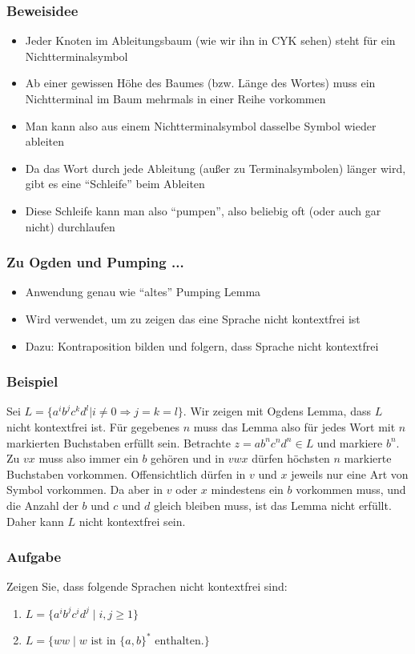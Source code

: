 \documentclass{beamer}
\begin{document}
{\begin{frame}
\frametitle{Beweisidee}
\begin{itemize}
\item Jeder Knoten im Ableitungsbaum (wie wir ihn in CYK sehen) steht für ein Nichtterminalsymbol
\item Ab einer gewissen Höhe des Baumes (bzw. Länge des Wortes) muss ein Nichtterminal im Baum mehrmals in einer Reihe vorkommen
\item Man kann also aus einem Nichtterminalsymbol dasselbe Symbol wieder ableiten
\item Da das Wort durch jede Ableitung (außer zu Terminalsymbolen) länger wird, gibt es eine ``Schleife'' beim Ableiten
\item Diese Schleife kann man also ``pumpen'', also beliebig oft (oder auch gar nicht) durchlaufen
\end{itemize}
\end{frame}

\begin{frame}
\frametitle{Zu Ogden und Pumping ...}
\begin{itemize}
\item Anwendung genau wie ``altes'' Pumping Lemma
\item Wird verwendet, um zu zeigen das eine Sprache nicht kontextfrei ist
\item Dazu: Kontraposition bilden und folgern, dass Sprache nicht kontextfrei
\end{itemize}
\end{frame}

\begin{frame}
\frametitle{Beispiel}
Sei $L = \{a^ib^jc^kd^l | i \neq 0 \Rightarrow j = k = l\}$. Wir zeigen mit Ogdens Lemma, dass $L$ nicht kontextfrei ist.
Für gegebenes $n$ muss das Lemma also für jedes Wort mit $n$ markierten Buchstaben erfüllt sein. Betrachte $z = ab^nc^nd^n \in L$ und markiere $b^n$.
Zu $vx$ muss also immer ein $b$ gehören und in $vwx$ dürfen höchsten $n$ markierte Buchstaben vorkommen. Offensichtlich dürfen in $v$ und $x$ jeweils nur eine Art von Symbol vorkommen. Da aber in $v$ oder $x$ mindestens ein $b$ vorkommen muss, und die Anzahl der $b$ und $c$ und $d$ gleich bleiben muss, ist das Lemma nicht erfüllt. Daher kann $L$ nicht kontextfrei sein.
\end{frame}

\begin{frame}
\frametitle{Aufgabe}
Zeigen Sie, dass folgende Sprachen nicht kontextfrei sind:
\begin{enumerate}
 \item $L=\{a^ib^jc^id^j \mid i,j \geq 1 \}$
 \item $L=\{ww \mid w \text{ ist in }\{a, b\}^* \text{ enthalten.}\}$
\end{enumerate}
\end{frame}

}
\end{document}
